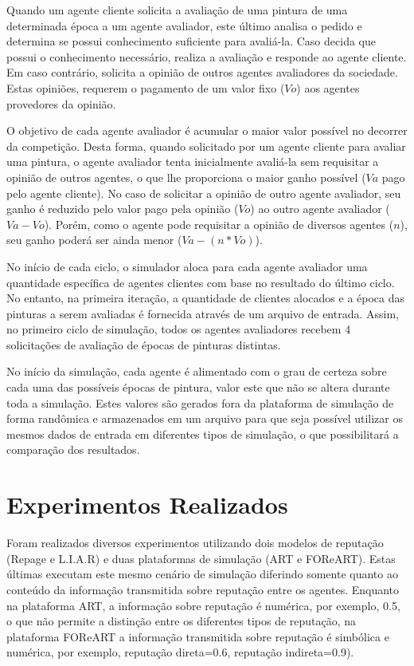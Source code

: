 \documentclass[]{article}
\begin{document}
Quando um agente cliente solicita a avaliação de uma pintura de uma determinada época a um agente avaliador, este último analisa o pedido e determina se possui conhecimento suficiente para avaliá-la. Caso decida que possui o conhecimento necessário, realiza a avaliação e responde ao agente cliente. Em caso contrário, solicita a opinião de outros agentes avaliadores da sociedade. Estas opiniões, requerem o pagamento de um valor fixo ($Vo$) aos agentes provedores da opinião.

O objetivo de cada agente avaliador é acumular o maior valor possível no decorrer da competição. Desta forma, quando solicitado por um agente cliente para avaliar uma pintura, o agente avaliador tenta inicialmente avaliá-la sem requisitar a opinião de outros agentes, o que lhe proporciona o maior ganho possível ($Va$ pago pelo agente cliente). No caso de solicitar a opinião de outro agente avaliador, seu ganho é reduzido pelo valor pago pela opinião ($Vo$) ao outro agente avaliador ($Va - Vo$). Porém, como o agente pode requisitar a opinião de diversos agentes ($n$), seu ganho poderá ser ainda menor ($Va - (n * Vo)$).

No início de cada ciclo, o simulador aloca para cada agente avaliador uma quantidade específica de agentes clientes com base no resultado do último ciclo. No entanto, na primeira iteração, a quantidade de clientes alocados e a época das pinturas a serem avaliadas é fornecida através de um arquivo de entrada. Assim, no primeiro ciclo de simulação, todos os agentes avaliadores recebem 4 solicitações de avaliação de épocas de pinturas distintas.

No início da simulação, cada agente é alimentado com o grau de certeza sobre cada uma das possíveis épocas de pintura, valor este que não se altera durante toda a simulação. Estes valores são gerados fora da plataforma de simulação de forma randômica e armazenados em um arquivo para que seja possível utilizar os mesmos dados de entrada em diferentes tipos de simulação, o que possibilitará a comparação dos resultados.

\section{Experimentos Realizados}
\label{experimentos}
%
Foram realizados diversos experimentos utilizando dois modelos de reputação (Repage e L.I.A.R) e duas plataformas de simulação (ART e FOReART). Estas últimas executam este mesmo cenário de simulação diferindo somente quanto ao conteúdo da informação transmitida sobre reputação entre os agentes. Enquanto na plataforma ART, a informação sobre reputação é numérica, por exemplo, 0.5, o que não permite a distinção entre os diferentes tipos de reputação, na plataforma FOReART a informação transmitida sobre reputação é simbólica e numérica, por exemplo, reputação direta=0.6, reputação indireta=0.9).
\end{document}
